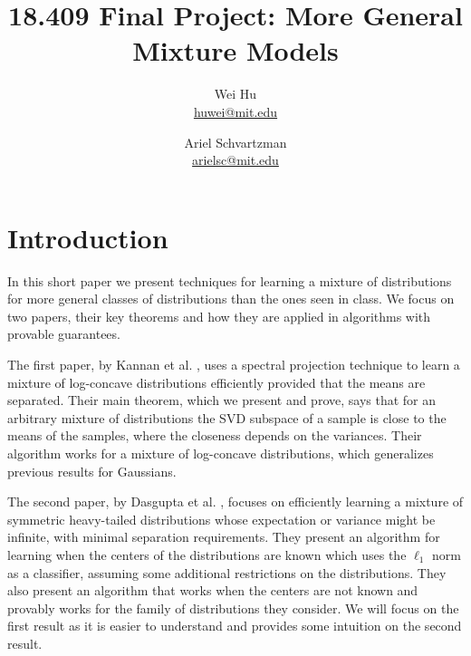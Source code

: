 \documentclass[11pt,letter]{article}
\begin{document}


\title{18.409 Final Project: More General Mixture Models}

\author{Wei Hu\\ \href{mailto:huwei@mit.edu}{huwei@mit.edu} \and Ariel Schvartzman \\ \href{mailto:arielsc@mit.edu}{arielsc@mit.edu}} 
 
\maketitle 

\section{Introduction}

In this short paper we present techniques for learning a mixture of distributions for more general classes of distributions than the ones seen in class. We focus on two papers, their key theorems and how they are applied in algorithms with provable guarantees. 

The first paper, by Kannan et al. \cite{Kannan08spectral}, uses a spectral projection technique to learn a mixture of log-concave distributions efficiently provided that the means are separated. Their main theorem, which we present and prove, says that for an arbitrary mixture of distributions the SVD subspace of a sample is close to the means of the samples, where the closeness depends on the variances. Their algorithm works for a mixture of log-concave distributions, which generalizes previous results for Gaussians.

The second paper, by Dasgupta et al. \cite{Dasgupta05heavy-tail}, focuses on efficiently learning a mixture of symmetric heavy-tailed distributions whose expectation or variance might be infinite, with minimal separation requirements. They present an algorithm for learning when the centers of the distributions are known which uses the $\ell_1$ norm as a classifier, assuming some additional restrictions on the distributions. They also present an algorithm that works when the centers are not known and provably works for the family of distributions they consider. We will focus on the first result as it is easier to understand and provides some intuition on the second result. 
\end{document}
